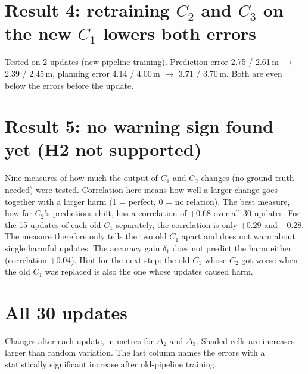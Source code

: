 \documentclass[10pt,a4paper]{article}
\begin{document}
\section*{Result 4: retraining $C_2$ and $C_3$ on the new $C_1$ lowers both errors}
Tested on 2 updates (new-pipeline training). Prediction error 2.75 / 2.61\,m $\rightarrow$ 2.39 / 2.45\,m,
planning error 4.14 / 4.00\,m $\rightarrow$ 3.71 / 3.70\,m. Both are even below the errors before the update.

\section*{Result 5: no warning sign found yet (H2 not supported)}
Nine measures of how much the output of $C_1$ and $C_2$ changes (no ground truth needed) were tested.
Correlation here means how well a larger change goes together with a larger harm (1 = perfect, 0 = no relation).
The best measure, how far $C_2$'s predictions shift, has a correlation of +0.68 over all 30 updates.
For the 15 updates of each old $C_1$ separately, the correlation is only +0.29 and $-$0.28.
The measure therefore only tells the two old $C_1$ apart and does not warn about single harmful updates.
The accuracy gain $\delta_1$ does not predict the harm either (correlation +0.04).
Hint for the next step: the old $C_1$ whose $C_2$ got worse when the old $C_1$ was replaced is also the one whose updates caused harm.

\section*{All 30 updates}
Changes after each update, in metres for $\Delta_2$ and $\Delta_3$. Shaded cells are increases larger than random variation.
The last column names the errors with a statistically significant increase after old-pipeline training.
\end{document}

